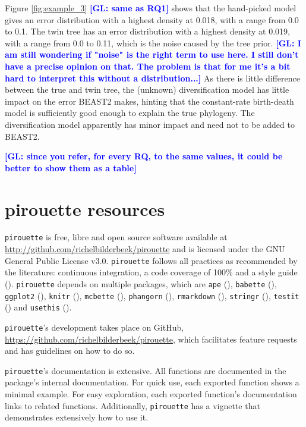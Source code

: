 \documentclass{article}
\newcommand{\giovanni}[1]{\textcolor{blue}{\textbf{[GL: #1]}}}
\begin{document}
Figure \ref{fig:example_3} \giovanni{same as RQ1} shows that the hand-picked model gives an error distribution with a highest density at 0.018, with a range from 0.0 to 0.1.
The twin tree has an error distribution with a highest density at 0.019,
with a range from 0.0 to 0.11, which is the noise caused by the tree prior. \giovanni{I am still wondering if "noise" is the right term to use here. I still don't have a precise opinion on that. The problem is that for me it's a bit hard to interpret this without a distribution...}
As there is little difference between the true and twin tree,
the (unknown) diversification model has little impact on the error
BEAST2 makes, hinting that the constant-rate birth-death model is
sufficiently good enough to explain the true phylogeny. 
The diversification model apparently has minor impact and need not to be
added to BEAST2.

\giovanni{since you refer, for every RQ, to the same values, it could be better to show them as a table}

\section{pirouette resources}

\verb;pirouette; is free, libre and open source software available at 
\url{http://github.com/richelbilderbeek/pirouette}
and is licensed under the GNU General Public License v3.0.
\verb;pirouette; follows all practices as recommended by the
literature: continuous integration, a code coverage of 100\%
and a style guide (\cite{style_guide}).
\verb;pirouette; depends on multiple packages, which are 
\verb;ape; (\cite{APE}), 
\verb;babette; (\cite{bilderbeek2018babette}),
\verb;ggplot2; (\cite{ggplot2}),
\verb;knitr; (\cite{knitr}),
\verb;mcbette; (\cite{mcbette}),
\verb;phangorn; (\cite{phangorn}),
\verb;rmarkdown; (\cite{rmarkdown}),
\verb;stringr; (\cite{stringr}),
\verb;testit; (\cite{testit}) and 
\verb;usethis; (\cite{usethis}).

\verb;pirouette;'s development takes place on GitHub,
\url{https://github.com/richelbilderbeek/pirouette}, 
which facilitates feature requests and 
has guidelines on how to do so.

\verb;pirouette;'s documentation is extensive. All functions are documented in the package's internal documentation. For quick use, 
each exported function shows a minimal example. 
For easy exploration, each exported function's documentation links to related functions.
Additionally, \verb;pirouette; has a vignette that demonstrates extensively how to use it. 
\end{document}
